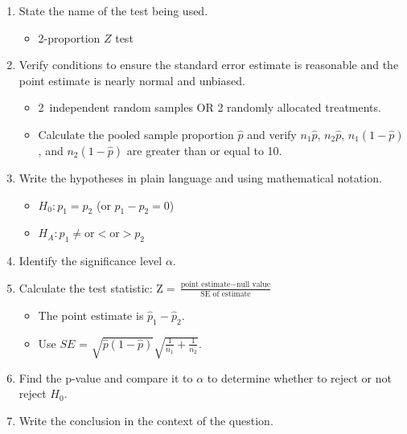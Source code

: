 \begin{termBox}{
\begin{enumerate}
\setlength{\itemsep}{0mm}
\item State the name of the test being used.
\vspace{-1.5mm}
\begin{itemize}
\item 2-proportion $Z$ test
\end{itemize}
\item Verify conditions to ensure the standard error estimate is reasonable and the point estimate is nearly normal and unbiased.\vspace{-1.5mm}
  \begin{itemize}
  \setlength{\itemsep}{0mm}
  \item 2~independent random samples OR 2 randomly allocated treatments. 
  \item Calculate the pooled sample proportion $\hat{p}$ and verify $n_1\hat{p}$, $n_2\hat{p}$, $n_1(1 - \hat{p})$, and $n_2(1 - \hat{p})$ are greater than or equal to 10.
  \end{itemize}
\item Write the hypotheses in plain language and using mathematical notation.\vspace{-1.5mm}
  \begin{itemize}
  \setlength{\itemsep}{0mm}
  \item $H_0: p_1 = p_2$ (or $p_1 - p_2 = 0$)
  \item $H_A: p_1 \ne \text{or} < \text{or} > p_2$
  \end{itemize}
\item Identify the significance level $\alpha$.
\item Calculate the test statistic: $\text{Z} = \frac{\text{point estimate} - \text{null value}}{\text{SE of estimate}}$
  \begin{itemize}
  \item The point estimate is $\hat{p}_1 - \hat{p}_2$.
  \item Use $SE$ = $\sqrt{\hat{p}(1-\hat{p})}\sqrt{\frac{1}{n_1} + \frac{1}{n_2}}$.
  \end{itemize}
\item Find the p-value and compare it to $\alpha$ to determine whether to reject or not reject $H_0$.
\item Write the conclusion in the context of the question.
\end{enumerate}}
\end{termBox}

